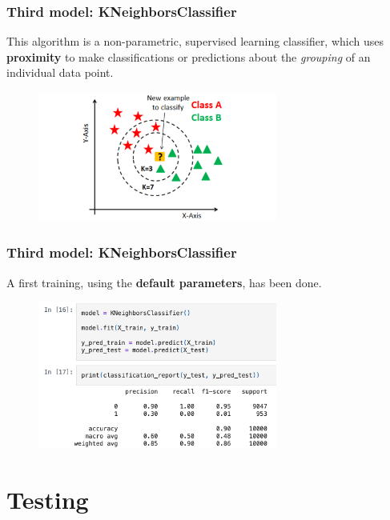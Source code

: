 \documentclass{beamer}
\begin{document}
\begin{frame}
\frametitle{Third model: \textbf{KNeighborsClassifier}}
This algorithm is a non-parametric, supervised learning classifier, which uses \textbf{proximity} to make classifications or predictions about the \textit{grouping} of an individual data point.
\begin{figure}
\centering
    \includegraphics[width=0.7\textwidth]{imgs/knn.png}
    \label{fig:knn}
\end{figure}
\end{frame}

\begin{frame}
\frametitle{Third model: \textbf{KNeighborsClassifier}}
A first training, using the \textbf{default parameters}, has been done.
\begin{figure}
\centering
    \includegraphics[width=0.7\textwidth]{imgs/knn_code.png}
    \label{fig:knn_code}
\end{figure}
\end{frame}


\section{Testing}
\end{document}
